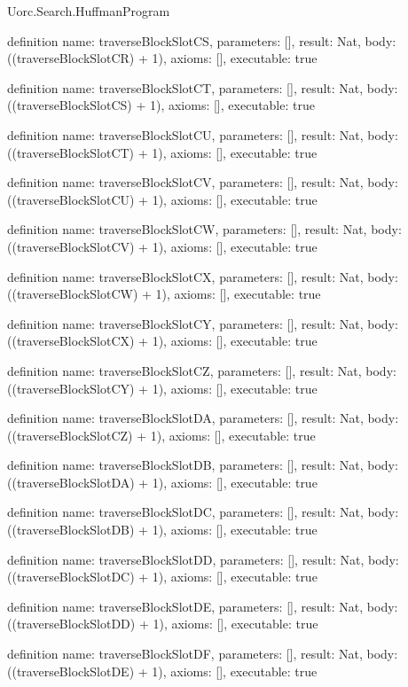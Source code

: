 \begin{lexlean}{Uorc.Search.HuffmanProgram}
\begin{semanticmodule}
definition{
  name: traverseBlockSlotCS,
  parameters: [],
  result: Nat,
  body: ((traverseBlockSlotCR) + 1),
  axioms: [],
  executable: true
}

definition{
  name: traverseBlockSlotCT,
  parameters: [],
  result: Nat,
  body: ((traverseBlockSlotCS) + 1),
  axioms: [],
  executable: true
}

definition{
  name: traverseBlockSlotCU,
  parameters: [],
  result: Nat,
  body: ((traverseBlockSlotCT) + 1),
  axioms: [],
  executable: true
}

definition{
  name: traverseBlockSlotCV,
  parameters: [],
  result: Nat,
  body: ((traverseBlockSlotCU) + 1),
  axioms: [],
  executable: true
}

definition{
  name: traverseBlockSlotCW,
  parameters: [],
  result: Nat,
  body: ((traverseBlockSlotCV) + 1),
  axioms: [],
  executable: true
}

definition{
  name: traverseBlockSlotCX,
  parameters: [],
  result: Nat,
  body: ((traverseBlockSlotCW) + 1),
  axioms: [],
  executable: true
}

definition{
  name: traverseBlockSlotCY,
  parameters: [],
  result: Nat,
  body: ((traverseBlockSlotCX) + 1),
  axioms: [],
  executable: true
}

definition{
  name: traverseBlockSlotCZ,
  parameters: [],
  result: Nat,
  body: ((traverseBlockSlotCY) + 1),
  axioms: [],
  executable: true
}

definition{
  name: traverseBlockSlotDA,
  parameters: [],
  result: Nat,
  body: ((traverseBlockSlotCZ) + 1),
  axioms: [],
  executable: true
}

definition{
  name: traverseBlockSlotDB,
  parameters: [],
  result: Nat,
  body: ((traverseBlockSlotDA) + 1),
  axioms: [],
  executable: true
}

definition{
  name: traverseBlockSlotDC,
  parameters: [],
  result: Nat,
  body: ((traverseBlockSlotDB) + 1),
  axioms: [],
  executable: true
}

definition{
  name: traverseBlockSlotDD,
  parameters: [],
  result: Nat,
  body: ((traverseBlockSlotDC) + 1),
  axioms: [],
  executable: true
}

definition{
  name: traverseBlockSlotDE,
  parameters: [],
  result: Nat,
  body: ((traverseBlockSlotDD) + 1),
  axioms: [],
  executable: true
}

definition{
  name: traverseBlockSlotDF,
  parameters: [],
  result: Nat,
  body: ((traverseBlockSlotDE) + 1),
  axioms: [],
  executable: true
}


\end{semanticmodule}
\end{lexlean}

